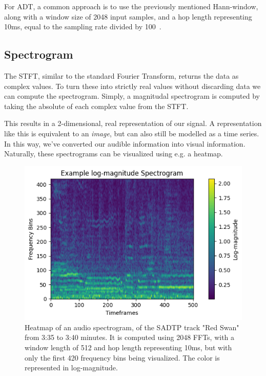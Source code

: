 For \gls{ADT}, a common approach is to use the previously mentioned Hann-window, along with a window size of 2048 input samples, and a hop length representing 10ms, equal to the sampling rate divided by 100~\cite{8350302, vogl2016recurrent,vogl2018multiinstrumentdrumtranscription, signals4040042}.

\subsection{Spectrogram}

The \gls{STFT}, similar to the standard Fourier Transform, returns the data as complex values. To turn these into strictly real values without discarding data we can compute the spectrogram. Simply, a magnitudal spectrogram is computed by taking the absolute of each complex value from the \gls{STFT}.

This results in a 2-dimensional, real representation of our signal. A representation like this is equivalent to an \textit{image}, but can also still be modelled as a time series. In this way, we've converted our audible information into visual information. Naturally, these spectrograms can be visualized using e.g. a heatmap.

\begin{figure}[H]
    \centering
    \includegraphics[scale=1.1]{figures/logspectrogram}
    \caption{Heatmap of an audio spectrogram, of the SADTP track "Red Swan" from 3:35 to 3:40 minutes. It is computed using 2048 \glspl{FFT}, with a window length of 512 and hop length representing 10ms, but with only the first 420 frequency bins being visualized. The color is represented in log-magnitude.}
    \label{SpectrogramFigure}
\end{figure}

